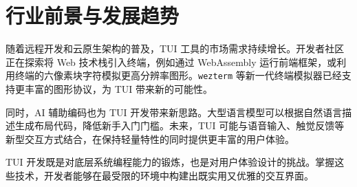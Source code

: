 \chapter{行业前景与发展趋势}
随着远程开发和云原生架构的普及，TUI 工具的市场需求持续增长。开发者社区正在探索将 Web 技术栈引入终端，例如通过 WebAssembly 运行前端框架，或利用终端的六像素块字符模拟更高分辨率图形。\texttt{wezterm} 等新一代终端模拟器已经支持更丰富的图形协议，为 TUI 带来新的可能性。\par
同时，AI 辅助编码也为 TUI 开发带来新思路。大型语言模型可以根据自然语言描述生成布局代码，降低新手入门门槛。未来，TUI 可能与语音输入、触觉反馈等新型交互方式结合，在保持轻量特性的同时提供更丰富的用户体验。\par
TUI 开发既是对底层系统编程能力的锻炼，也是对用户体验设计的挑战。掌握这些技术，开发者能够在最受限的环境中构建出既实用又优雅的交互界面。\par
